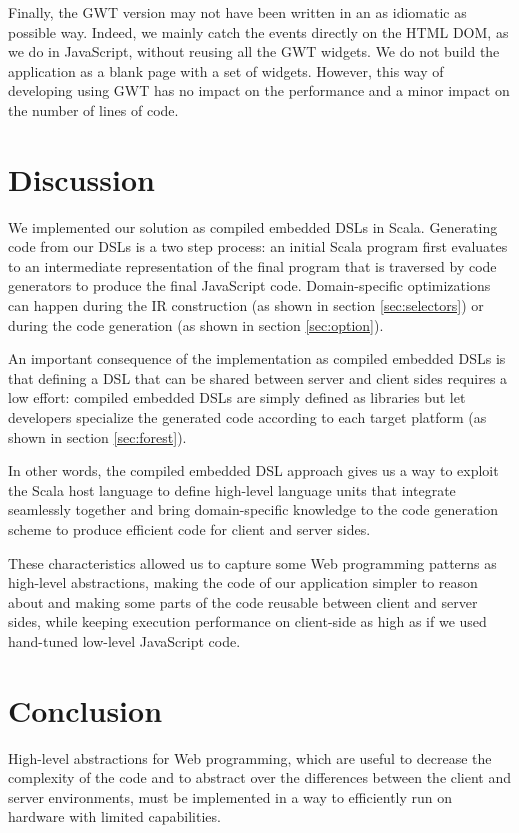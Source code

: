 \documentclass{llncs}
\begin{document}
Finally, the GWT version may not have been written in an as idiomatic as possible way. 
Indeed, we mainly catch the events directly on the HTML DOM, as we do in JavaScript, without
reusing all the GWT widgets. We do not build the application as a blank page with a set of
widgets. However, this way of developing using GWT has no impact on the performance and a minor
impact on the number of lines of code.

\section{Discussion}
\label{sec:discussion}

We implemented our solution as compiled embedded DSLs in Scala. Generating code from our DSLs is a
two step process: an initial Scala program first evaluates to an intermediate representation of
the final program that is traversed by code generators to produce the final JavaScript code.
Domain-specific optimizations can happen during the IR construction (as shown in section
\ref{sec:selectors}) or during the code generation (as shown in section \ref{sec:option}).

An important consequence of the implementation as compiled embedded DSLs is that defining a DSL
that can be shared between server and client sides requires a low effort: compiled embedded DSLs are
simply defined as libraries but let developers specialize the generated code according to each
target platform (as shown in section \ref{sec:forest}).

In other words, the compiled embedded DSL approach gives us a way to exploit the Scala host language
to define high-level language units that integrate seamlessly together and bring domain-specific
knowledge to the code generation scheme to produce efficient code for client and server sides.

These characteristics allowed us to capture some Web programming patterns as high-level
abstractions, making the code of our application simpler to reason about and making some parts of
the code reusable between client and server sides, while keeping execution performance on
client-side as high as if we used hand-tuned low-level JavaScript code.

\section{Conclusion}
\label{sec:conclusion}

High-level abstractions for Web programming, which are useful to decrease the complexity of the code
and to abstract over the differences between the client and server environments, must be implemented
in a way to efficiently run on hardware with limited capabilities.
\end{document}
